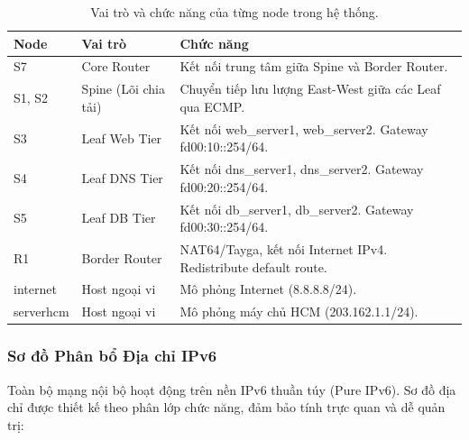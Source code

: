 \begin{table}[H]
    \centering
    \caption{Vai trò và chức năng của từng node trong hệ thống.}
    \label{tab:node_roles}
    \begin{tabular}{|l|l|p{8cm}|}
        \hline
        \textbf{Node} & \textbf{Vai trò} & \textbf{Chức năng} \\
        \hline
        S7 & Core Router & Kết nối trung tâm giữa Spine và Border Router. \\
        \hline
        S1, S2 & Spine (Lõi chia tải) & Chuyển tiếp lưu lượng East-West giữa các Leaf qua ECMP. \\
        \hline
        S3 & Leaf Web Tier & Kết nối web\_server1, web\_server2. Gateway fd00:10::254/64. \\
        \hline
        S4 & Leaf DNS Tier & Kết nối dns\_server1, dns\_server2. Gateway fd00:20::254/64. \\
        \hline
        S5 & Leaf DB Tier & Kết nối db\_server1, db\_server2. Gateway fd00:30::254/64. \\
        \hline
        R1 & Border Router & NAT64/Tayga, kết nối Internet IPv4. Redistribute default route. \\
        \hline
        internet & Host ngoại vi & Mô phỏng Internet (8.8.8.8/24). \\
        \hline
        serverhcm & Host ngoại vi & Mô phỏng máy chủ HCM (203.162.1.1/24). \\
        \hline
    \end{tabular}
\end{table}

\subsubsection{Sơ đồ Phân bổ Địa chỉ IPv6}

Toàn bộ mạng nội bộ hoạt động trên nền IPv6 thuần túy (Pure IPv6). Sơ đồ địa chỉ được thiết kế theo phân lớp chức năng, đảm bảo tính trực quan và dễ quản trị:

